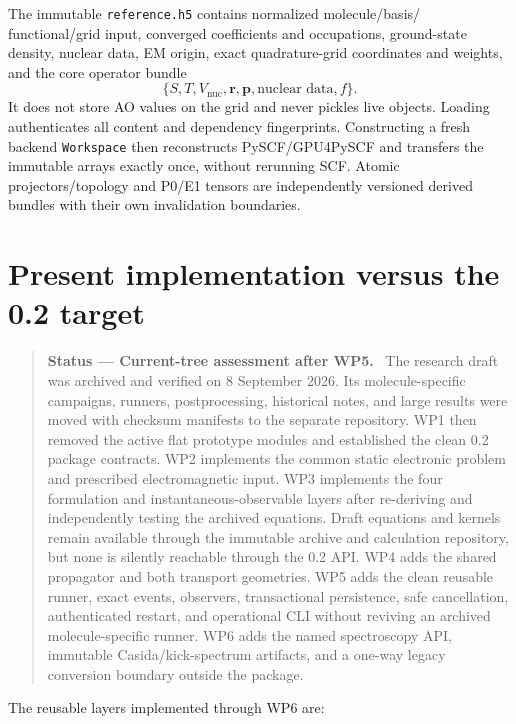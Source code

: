 \documentclass[11pt]{article}
\newcommand{\vect}[1]{\bm{#1}}
\newcommand{\code}[1]{\texttt{#1}}
\newenvironment{statusbox}[1]
  {\begin{quote}\small\textbf{Status --- #1.}\ }
  {\end{quote}}
\begin{document}
The immutable \code{reference.h5} contains normalized molecule/basis/
functional/grid input, converged coefficients and occupations, ground-state
density, nuclear data, EM origin, exact quadrature-grid coordinates and
weights, and the core operator bundle
\[
  \{S,T,V_{\mathrm{nuc}},\vect r,\vect p,
    \text{nuclear data},f\}.
\]
It does not store AO values on the grid and never pickles live objects.
Loading authenticates all content and dependency fingerprints. Constructing a
fresh backend \code{Workspace} then reconstructs PySCF/GPU4PySCF and transfers
the immutable arrays exactly once, without rerunning SCF.
Atomic projectors/topology and P0/E1 tensors are independently versioned
derived bundles with their own invalidation boundaries.

\section{Present implementation versus the 0.2 target}

\begin{statusbox}{Current-tree assessment after WP5}
The research draft was archived and verified on 8 September 2026. Its
molecule-specific campaigns, runners, postprocessing, historical notes, and
large results were moved with checksum manifests to the separate
 repository. WP1 then removed the active flat prototype
modules and established the clean 0.2 package contracts. WP2 implements the
common static electronic problem and prescribed electromagnetic input. WP3
implements the four formulation and instantaneous-observable layers after
re-deriving and independently testing the archived equations. Draft equations
and kernels remain available through the immutable archive and calculation
repository, but none is silently reachable through the 0.2 API. WP4 adds the
shared propagator and both transport geometries. WP5 adds the clean reusable
runner, exact events, observers, transactional persistence, safe cancellation,
authenticated restart, and operational CLI without reviving an archived
molecule-specific runner.
WP6 adds the named spectroscopy API, immutable Casida/kick-spectrum artifacts,
and a one-way legacy conversion boundary outside the package.
\end{statusbox}

The reusable layers implemented through WP6 are:
\end{document}
